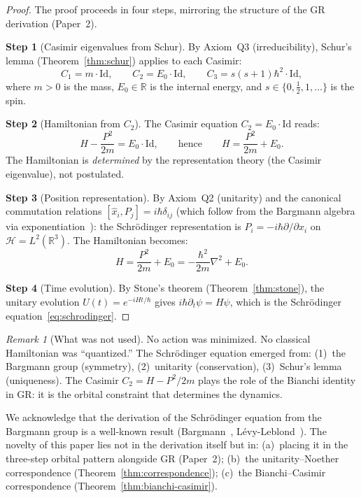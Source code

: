 \documentclass[12pt]{article}
\theoremstyle{plain}
\theoremstyle{definition}
\theoremstyle{remark}
\newtheorem{remark}[theorem]{Remark}
\begin{document}
\begin{proof}
The proof proceeds in four steps, mirroring the structure of the GR derivation (Paper~2).

\textbf{Step 1} (Casimir eigenvalues from Schur). By Axiom~Q3 (irreducibility), Schur's lemma (Theorem~\ref{thm:schur}) applies to each Casimir:
\begin{equation}
C_1 = m \cdot \mathrm{Id}, \qquad C_2 = E_0 \cdot \mathrm{Id}, \qquad C_3 = s(s+1)\hbar^2 \cdot \mathrm{Id},
\end{equation}
where $m > 0$ is the mass, $E_0 \in \mathbb{R}$ is the internal energy, and $s \in \{0, \frac{1}{2}, 1, \ldots\}$ is the spin.

\textbf{Step 2} (Hamiltonian from $C_2$). The Casimir equation $C_2 = E_0 \cdot \mathrm{Id}$ reads:
\begin{equation}
H - \frac{P^2}{2m} = E_0 \cdot \mathrm{Id}, \qquad\text{hence}\qquad H = \frac{P^2}{2m} + E_0.
\end{equation}
The Hamiltonian is \emph{determined} by the representation theory (the Casimir eigenvalue), not postulated.

\textbf{Step 3} (Position representation). By Axiom~Q2 (unitarity) and the canonical commutation relations $[\hat{x}_i, P_j] = i\hbar\delta_{ij}$ (which follow from the Bargmann algebra via exponentiation~\cite{bargmann1954}): the Schr\"odinger representation is $P_i = -i\hbar\partial/\partial x_i$ on $\mathcal{H} = L^2(\mathbb{R}^3)$. The Hamiltonian becomes:
\begin{equation}
H = \frac{P^2}{2m} + E_0 = -\frac{\hbar^2}{2m}\nabla^2 + E_0.
\end{equation}

\textbf{Step 4} (Time evolution). By Stone's theorem (Theorem~\ref{thm:stone}), the unitary evolution $U(t) = e^{-iHt/\hbar}$ gives $i\hbar\partial_t\psi = H\psi$, which is the Schr\"odinger equation~\eqref{eq:schrodinger}.
\end{proof}

\begin{remark}[What was not used]\label{rmk:no-lagrangian-qm}
No action was minimized. No classical Hamiltonian was ``quantized.'' The Schr\"odinger equation emerged from: (1)~the Bargmann group (symmetry), (2)~unitarity (conservation), (3)~Schur's lemma (uniqueness). The Casimir $C_2 = H - P^2/2m$ plays the role of the Bianchi identity in GR: it is the orbital constraint that determines the dynamics.

We acknowledge that the derivation of the Schr\"odinger equation from the Bargmann group is a well-known result (Bargmann~\cite{bargmann1954}, L\'evy-Leblond~\cite{levyleblond1967}). The novelty of this paper lies not in the derivation itself but in: (a)~placing it in the three-step orbital pattern alongside GR (Paper~2); (b)~the unitarity--Noether correspondence (Theorem~\ref{thm:correspondence}); (c)~the Bianchi--Casimir correspondence (Theorem~\ref{thm:bianchi-casimir}).
\end{remark}
\end{document}
